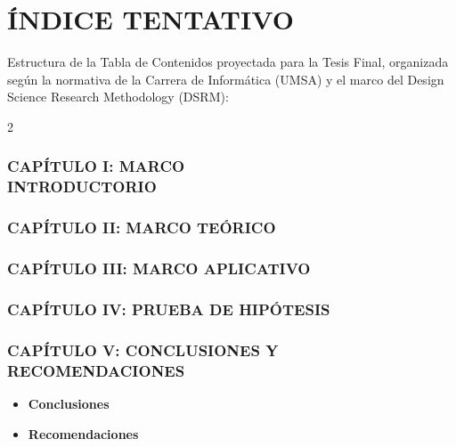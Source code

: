 \section{ÍNDICE TENTATIVO}

Estructura de la Tabla de Contenidos proyectada para la Tesis Final, organizada seg\'{u}n la normativa de la Carrera de Inform\'{a}tica (UMSA) y el marco del Design Science Research Methodology (DSRM):

\begingroup
\renewcommand{\baselinestretch}{0.95}\selectfont
\footnotesize
{}

\begin{multicols}{2}

\vspace{-0.2cm}
\subsubsection*{CAPÍTULO I: MARCO \\ INTRODUCTORIO}
\vspace{-0.2cm}

\vspace{-0.3cm}
\subsubsection*{CAPÍTULO II: MARCO TEÓRICO}
\vspace{-0.2cm}

\vspace{-0.3cm}
\subsubsection*{CAPÍTULO III: MARCO APLICATIVO}
\vspace{-0.2cm}

\vspace{-0.3cm}
\subsubsection*{CAPÍTULO IV: PRUEBA DE HIPÓTESIS}
\vspace{-0.2cm}

\vspace{-0.3cm}
\subsubsection*{CAPÍTULO V: CONCLUSIONES Y RECOMENDACIONES}
\vspace{-0.2cm}
\begin{itemize}
    \item[5.1.] \textbf{Conclusiones}
    \item[5.2.] \textbf{Recomendaciones}
\end{itemize}

\end{multicols}
\endgroup
